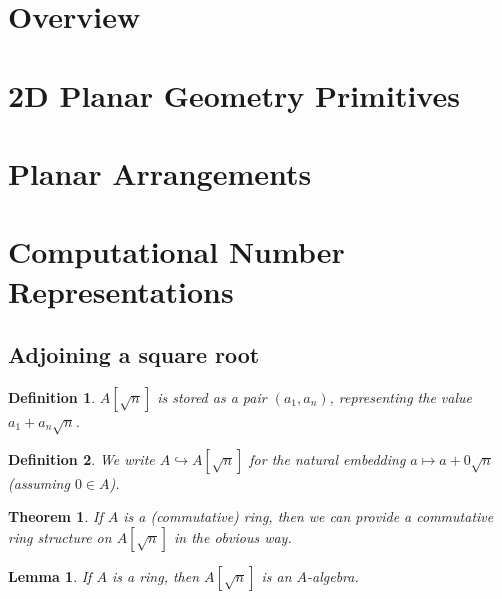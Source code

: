 \newtheorem{definition}{Definition}
\newtheorem{theorem}{Theorem}
\newtheorem{lemma}{Lemma}

\section{Overview}

\section{2D Planar Geometry Primitives}

\section{Planar Arrangements}

\section{Computational Number Representations}

\subsection{Adjoining a square root}

\begin{definition}
  \label{def:adjoin}
  \leanok
  $A[\sqrt{n}]$ is stored as a pair $(a_1, a_n)$, representing the value
  $a_1 + a_n\sqrt{n}$.
\end{definition}

\begin{definition}
  \label{def:adjoinEmbedding}
  \leanok
  We write $A \hookrightarrow A[\sqrt{n}]$ for the natural embedding
  $a \mapsto a + 0\sqrt{n}$ (assuming $0 ∈ A$).
\end{definition}

\begin{theorem}
  \label{thm:adjoinRing}
  \leanok
  If $A$ is a (commutative) ring, then we can provide a commutative ring structure
  on $A[\sqrt{n}]$ in the obvious way.
\end{theorem}

\begin{lemma}
  \label{thm:adjoinAlgebra}
  \leanok
  If $A$ is a ring, then $A[\sqrt{n}]$ is an $A$-algebra.
\end{lemma}

